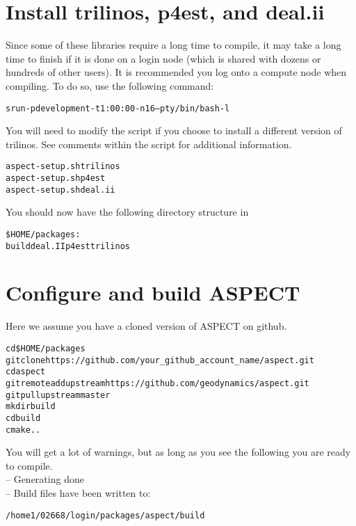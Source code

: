 \documentclass[12pt]{article}
\begin{document}
 \section{Install trilinos, p4est, and deal.ii}
 
Since some of these libraries require a long time to compile, it may take a long time to
finish if it is done on a login node (which is shared with dozens or hundreds of other users).
It is recommended you log onto a compute node when compiling. To do so, use the following
command: \\

\begin{alltt}\footnotesize
srun -p development -t 1:00:00 -n 16 --pty /bin/bash -l
\end{alltt}


\noindent You will need to modify the script if you choose to install a different version of trilinos.  See comments within the script for additional information.\\
 
 \begin{alltt}\footnotesize
 aspect-setup.sh trilinos 
 aspect-setup.sh p4est 
 aspect-setup.sh deal.ii    
 \end{alltt}
 
 \noindent You should now have the following directory structure in  \begin{alltt}\footnotesize \$HOME/packages:  \\
  
  build  deal.II  p4est  trilinos
\end{alltt}

 \section{Configure and build ASPECT}
 Here we assume you have a cloned version of ASPECT on github.  
 \begin{alltt}\footnotesize
 cd \$HOME/packages 
 git clone https://github.com/your\_github\_account\_name/aspect.git 
 cd aspect 
 git remote add upstream https://github.com/geodynamics/aspect.git 
 git pull upstream master  
 mkdir build 
 cd build 
 cmake ..  
 \end{alltt}

\noindent You will get a lot of warnings, but as long as you see the following you are ready to compile. \\
-- Generating done \\
-- Build files have been written to: \begin{alltt}\footnotesize /home1/02668/login/packages/aspect/build \end{alltt}
\end{document}
